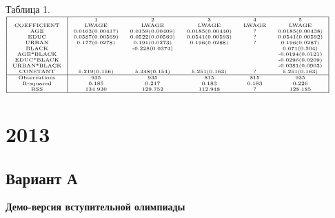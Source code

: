 \documentclass[addpoints, answers]{exam} %
\begin{document}
\begin{questions}
\begin{parts}
\end{parts}
Таблица 1.\\
$\begin{tiny}
\begin{tabular}{|c|ccccc|}
 \hline
 & 1 & 2 & 3 & 4 & 5\\
 COEFFICIENT & LWAGE & LWAGE & LWAGE & LWAGE & LWAGE\\
 AGE & 0.0163(0.00417) & 0.0159(0.00409) & 0.0185(0.00440) & ? & 0.0185(0.00438)\\
 EDUC & 0.0587(0.00569) & 0.0522(0.00569) & 0.0541(0.00593) & ? & 0.0541(0.00592)\\
 URBAN & 0.177(0.0278) & 0.191(0.0273) & 0.196(0.0288) & ? & 0.196(0.0287)\\
 BLACK & & -0.228(0.0374) & & & 0.671(0.504)\\
 AGE*BLACK & & & & & -0.0194(0.0121)  \\
 EDUC*BLACK & & & & & -0.0296(0.0209)\\
 URBAN*BLACK & & & & & -0.0381(0.0903)\\
 CONSTANT & 5.219(0.156) & 5.348(0.154) & 5.251(0.163) & ? & 5.251(0.163)\\
 \hline
 Observations & 935 & 935 & 815 & 815 & 935\\
 R-squared & 0.185 & 0.217 & 0.183 & 0.183 & 0.226\\
 RSS & 134.930 & 129.752 & 112.948& ? & 128.185\\
 \hline
\end{tabular}
\end{tiny}$
\end{questions}
\newpage
\section{2013}

\subsection{Вариант А}
\textbf{Демо-версия вступительной олимпиады}
\end{document}
